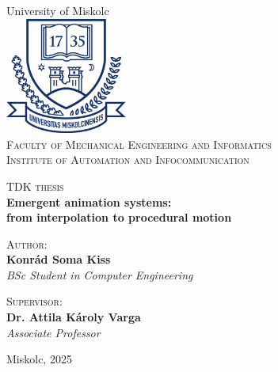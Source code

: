 \begin{titlepage}
    \centering

    \vspace*{2cm}

    University of Miskolc\\
    \includegraphics[width=0.3\textwidth]{./img/university-logo.jpg}\\
    {\scshape Faculty of Mechanical Engineering and Informatics}\\
    {\scshape Institute of Automation and Infocommunication}\\

    \vspace{2cm}

    {\normalsize \scshape TDK thesis}\\
    {\small \bfseries Emergent animation systems:\\ from interpolation to procedural motion}\\

    \vspace*{\fill}

    {\normalsize \scshape Author:}\\
    {\small \bfseries Konrád Soma Kiss}\\
    \textit{\small  BSc Student in Computer Engineering}\\

    \vspace{2cm}

    {\normalsize \scshape Supervisor:}\\
    {\small \bfseries Dr. Attila Károly Varga}\\
    \textit{\small Associate Professor}\\

    \vspace{2cm}
    
    {\small Miskolc, 2025}\\
\end{titlepage}